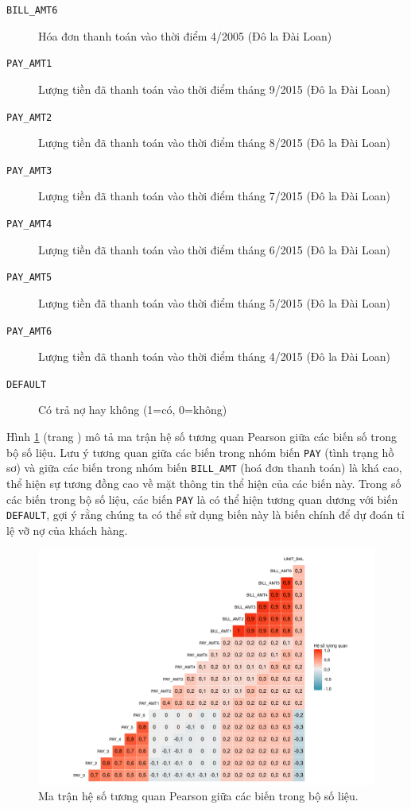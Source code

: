 \documentclass[a4paper]{report}\usepackage[]{graphicx}\usepackage[]{color}
\newenvironment{knitrout}{}{} %
\begin{document}
\begin{description}
  \item [\texttt{BILL\_AMT6}] Hóa đơn thanh toán vào thời điểm 4/2005 (Đô la Đài Loan)
  \item [\texttt{PAY\_AMT1}] Lượng tiền đã thanh toán vào thời điểm tháng 9/2015 (Đô la Đài Loan)
  \item [\texttt{PAY\_AMT2}] Lượng tiền đã thanh toán vào thời điểm tháng 8/2015 (Đô la Đài Loan)
  \item [\texttt{PAY\_AMT3}] Lượng tiền đã thanh toán vào thời điểm tháng 7/2015 (Đô la Đài Loan)
  \item [\texttt{PAY\_AMT4}] Lượng tiền đã thanh toán vào thời điểm tháng 6/2015 (Đô la Đài Loan)
  \item [\texttt{PAY\_AMT5}] Lượng tiền đã thanh toán vào thời điểm tháng 5/2015 (Đô la Đài Loan)
  \item [\texttt{PAY\_AMT6}] Lượng tiền đã thanh toán vào thời điểm tháng 4/2015 (Đô la Đài Loan)
  \item [\texttt{DEFAULT}] Có trả nợ hay không (1=có, 0=không)
\end{description}


Hình \ref{fig:corr_mat} (trang \pageref{fig:corr_mat}) mô tả ma trận hệ số tương quan Pearson giữa các biến số trong bộ số liệu. 
Lưu ý tương quan giữa các biến trong nhóm biến \texttt{PAY} (tình trạng hồ sơ) và 
giữa các biến trong nhóm biến \texttt{BILL\_AMT} (hoá đơn thanh toán) là khá cao, thể hiện sự tương đồng cao về mặt thông tin thể hiện của các biến này.
Trong số các biến trong bộ số liệu, các biến \texttt{PAY} là có thể hiện tương quan dương với biến \texttt{DEFAULT}, gợi ý rằng chúng ta có thể sử dụng biến này là biến chính để dự đoán tỉ lệ vỡ nợ của khách hàng.

\begin{figure}[h]
\centering
\capstart
\begin{knitrout}\small
{}\color{fgcolor}
\includegraphics[width=\textwidth]{Figures/corr_mat-1} 

\end{knitrout}
\caption[Ma trận hệ số tương quan Pearson]{Ma trận hệ số tương quan Pearson giữa các biến trong bộ số liệu.}
\label{fig:corr_mat}
\end{figure}
\end{document}
